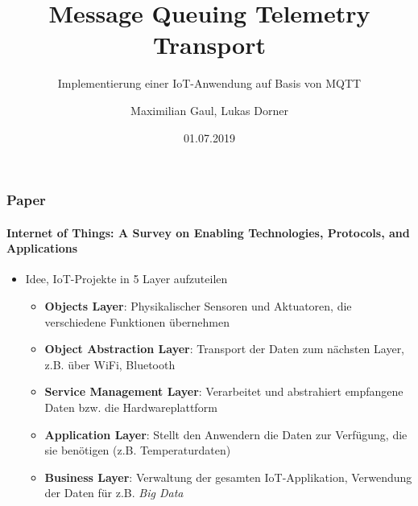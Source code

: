 \documentclass{beamer}
\title{Message Queuing Telemetry Transport}
\subtitle{Implementierung einer IoT-Anwendung auf Basis von MQTT}
\author{Maximilian Gaul, Lukas Dorner}
\date{01.07.2019}
\begin{document}
	
\begin{frame}
	\titlepage
\end{frame}

\begin{frame}

\frametitle{Paper}
\framesubtitle{Internet of Things: A Survey on Enabling Technologies, Protocols, and Applications}
\begin{itemize}
	\item Idee, IoT-Projekte in 5 Layer aufzuteilen
	\begin{itemize}
		\item \textbf{Objects Layer}: Physikalischer Sensoren und Aktuatoren, die verschiedene Funktionen übernehmen
		\item \textbf{Object Abstraction Layer}: Transport der Daten zum nächsten Layer, z.B. über WiFi, Bluetooth
		\item \textbf{Service Management Layer}: Verarbeitet und abstrahiert empfangene Daten bzw. die Hardwareplattform
		\item \textbf{Application Layer}: Stellt den Anwendern die Daten zur Verfügung, die sie benötigen (z.B. Temperaturdaten)
		\item \textbf{Business Layer}: Verwaltung der gesamten IoT-Applikation, Verwendung der Daten für z.B. \textit{Big Data}
	\end{itemize}
\end{itemize}

\end{frame}
\end{document}
